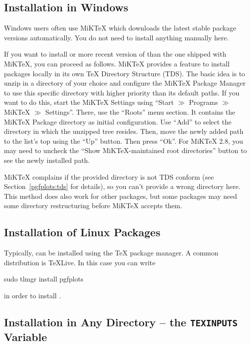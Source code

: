 \subsection{Installation in Windows}

Windows users often use MiK\TeX{} which downloads the latest stable package
versions automatically. You do not need to install anything manually here.

If you want to install or more recent version of \PGFPlots{} than the one
shipped with MiK\TeX{}, you can proceed as follows. MiK\TeX{} provides a
feature to install packages locally in its own \TeX{} Directory Structure
(TDS). The basic idea is to unzip \PGFPlots{} in a directory of your choice and
configure the MiK\TeX{} Package Manager to use this specific directory with
higher priority than its default paths. If you want to do this, start the
MiK\TeX{} Settings using ``Start $\gg$ Programs $\gg$ MiK\TeX{} $\gg$
Settings''. There, use the ``Roots'' menu section. It contains the MiK\TeX{}
Package directory as initial configuration. Use ``Add'' to select the directory
in which the unzipped \PGFPlots{} tree resides. Then, move the newly added path
to the list's top using the ``Up'' button. Then press ``Ok''. For MiK\TeX{}
2.8, you may need to uncheck the ``Show MiK\TeX{}-maintained root directories''
button to see the newly installed path.

MiK\TeX{} complains if the provided directory is not TDS conform (see
Section~\ref{pgfplots:tds} for details), so you can't provide a wrong directory
here. This method does also work for other packages, but some packages may need
some directory restructuring before MiK\TeX{} accepts them.


\subsection{Installation of Linux Packages}

Typically, \PGFPlots{} can be installed using the \TeX{} package manager. A
common distribution is \TeX{}Live. In this case you can write
%
\begin{codeexample}
sudo tlmgr install pgfplots
\end{codeexample}
%
\noindent in order to install \PGFPlots{}.


\subsection{Installation in Any Directory -- the \texttt{TEXINPUTS} Variable}

